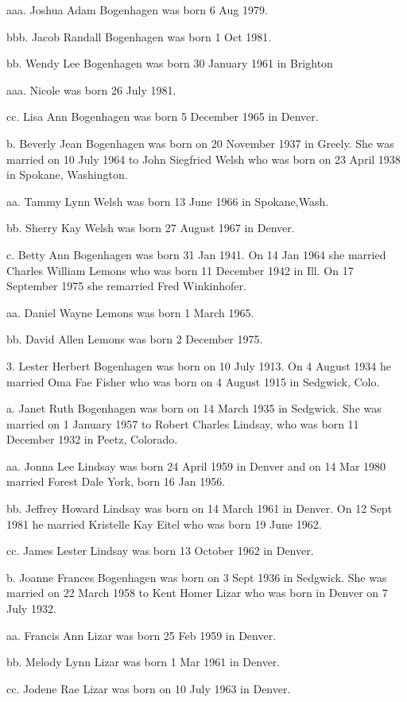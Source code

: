 \documentclass[a4paper]{article}
\begin{document}
aaa. Joshua Adam Bogenhagen was born 6 Aug 1979.

bbb. Jacob Randall Bogenhagen was born 1 Oct 1981.

bb. Wendy Lee Bogenhagen was born 30 January 1961 in Brighton
				
aaa. Nicole was born 26 July 1981.

cc. Lisa Ann Bogenhagen was born 5 December 1965 in Denver.

b. Beverly Jean Bogenhagen was born on 20 November 1937 in Greely. She was married on 10 July 1964 to John Siegfried Welsh who was born on 23 April 1938 in Spokane, Washington.
				
aa. Tammy Lynn Welsh was born 13 June 1966 in Spokane,Wash.

bb. Sherry Kay Welsh was born 27 August 1967 in Denver.

c. Betty Ann Bogenhagen was born 31 Jan 1941.  On 14 Jan 1964 she married Charles William Lemons who was born 11 December 1942 in Ill. On 17 September  1975 she remarried Fred Winkinhofer.

aa. Daniel Wayne Lemons was born 1 March 1965.

bb. David Allen Lemons was born 2 December 1975.

3. Lester Herbert Bogenhagen was born on 10 July 1913.  On 4 August 1934 he married Oma Fae Fisher who was born on 4 August 1915 in Sedgwick, Colo.

a. Janet Ruth Bogenhagen was born on 14 March 1935 in Sedgwick. She was married on 1 January 1957 to Robert Charles Lindsay, who was born 11 December 1932 in Peetz, Colorado.
 
aa. Jonna Lee Lindsay was born 24 April 1959 in Denver and on 14 Mar 1980 married Forest Dale York, born 16 Jan 1956.
			
bb.  Jeffrey Howard Lindsay was born on 14 March 1961 in Denver.  On 12 Sept 1981 he married Kristelle Kay Eitel who was born 19 June 1962.

cc. James Lester Lindsay was born 13 October 1962 in Denver.

b. Joanne Frances Bogenhagen was born on 3 Sept 1936 in Sedgwick. She was married on 22 March 1958 to Kent Homer Lizar who was born in Denver on 7 July 1932.

aa. Francis Ann Lizar was born 25 Feb 1959 in Denver.

bb. Melody Lynn Lizar was born 1 Mar 1961 in Denver.

cc. Jodene Rae Lizar was born on 10 July 1963 in Denver.
		
\end{document}
